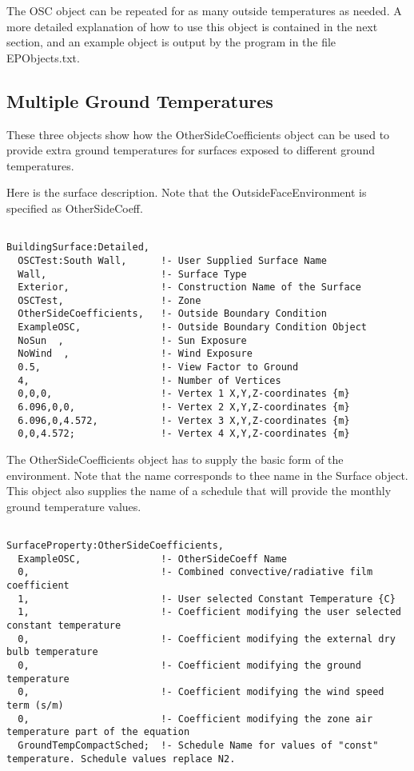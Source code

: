 The OSC object can be repeated for as many outside temperatures as needed. A more detailed explanation of how to use this object is contained in the next section, and an example object is output by the program in the file EPObjects.txt.

\subsection{Multiple Ground Temperatures}\label{multiple-ground-temperatures}

These three objects show how the OtherSideCoefficients object can be used to provide extra ground temperatures for surfaces exposed to different ground temperatures.

Here is the surface description. Note that the OutsideFaceEnvironment is specified as OtherSideCoeff.

\begin{lstlisting}

BuildingSurface:Detailed,
  OSCTest:South Wall,      !- User Supplied Surface Name
  Wall,                    !- Surface Type
  Exterior,                !- Construction Name of the Surface
  OSCTest,                 !- Zone
  OtherSideCoefficients,   !- Outside Boundary Condition
  ExampleOSC,              !- Outside Boundary Condition Object
  NoSun  ,                 !- Sun Exposure
  NoWind  ,                !- Wind Exposure
  0.5,                     !- View Factor to Ground
  4,                       !- Number of Vertices
  0,0,0,                   !- Vertex 1 X,Y,Z-coordinates {m}
  6.096,0,0,               !- Vertex 2 X,Y,Z-coordinates {m}
  6.096,0,4.572,           !- Vertex 3 X,Y,Z-coordinates {m}
  0,0,4.572;               !- Vertex 4 X,Y,Z-coordinates {m}
\end{lstlisting}

The OtherSideCoefficients object has to supply the basic form of the environment. Note that the name corresponds to thee name in the Surface object. This object also supplies the name of a schedule that will provide the monthly ground temperature values.

\begin{lstlisting}

SurfaceProperty:OtherSideCoefficients,
  ExampleOSC,              !- OtherSideCoeff Name
  0,                       !- Combined convective/radiative film coefficient
  1,                       !- User selected Constant Temperature {C}
  1,                       !- Coefficient modifying the user selected constant temperature
  0,                       !- Coefficient modifying the external dry bulb temperature
  0,                       !- Coefficient modifying the ground temperature
  0,                       !- Coefficient modifying the wind speed term (s/m)
  0,                       !- Coefficient modifying the zone air temperature part of the equation
  GroundTempCompactSched;  !- Schedule Name for values of "const" temperature. Schedule values replace N2.
\end{lstlisting}

